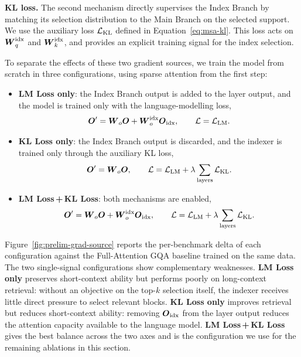 \documentclass{llmxive}
\providecommand{\bm}[1]{\boldsymbol{#1}}
\providecommand{\Ls}{\mathcal{L}}
\providecommand{\Figref}[1]{Figure~\ref{#1}}
\providecommand{\Eqref}[1]{Equation~\ref{#1}}
\providecommand{\mO}{{\bm{O}}}
\providecommand{\mW}{{\bm{W}}}
\begin{document}
\textbf{KL loss.} The second mechanism directly supervises the Index Branch by matching its selection distribution to the Main Branch on the selected support. We use the auxiliary loss $\Ls_{\rm KL}$ defined in \Eqref{eq:msa-kl}. This loss acts on $\mW^{\rm idx}_q$ and $\mW^{\rm idx}_k$, and provides an explicit training signal for the index selection. 

To separate the effects of these two gradient sources, we train the model from scratch in three configurations, using sparse attention from the first step:
\begin{itemize}
    \item \textbf{LM Loss only}: the Index Branch output is added to the layer output, and the model is trained only with the language-modelling loss,
    \begin{equation}
    \mO' = \mW_o \mO + \mW^{\rm idx}_o \mO_{\rm idx},
    \qquad
    \Ls = \Ls_{\rm LM}.
    \end{equation}

    \item \textbf{KL Loss only}: the Index Branch output is discarded, and the indexer is trained only through the auxiliary KL loss,
    \begin{equation}
    \mO' = \mW_o \mO,
    \qquad
    \Ls =\Ls_{\rm LM}+\lambda \sum_{\rm layers} \Ls_{\rm KL}.
    \end{equation}

    \item \textbf{LM Loss\,+\,KL Loss}: both mechanisms are enabled,
    \begin{equation}
    \mO' = \mW_o \mO + \mW^{\rm idx}_o \mO_{\rm idx},
    \qquad
    \Ls =\Ls_{\rm LM}+\lambda \sum_{\rm layers} \Ls_{\rm KL}.
    \end{equation}
\end{itemize}

\Figref{fig:prelim-grad-source} reports the per-benchmark delta of each configuration against the Full-Attention GQA baseline trained on the same data. The two single-signal configurations show complementary weaknesses. \textbf{LM Loss only} preserves short-context ability but performs poorly on long-context retrieval: without an objective on the top-$k$ selection itself, the indexer receives little direct pressure to select relevant blocks. \textbf{KL Loss only} improves retrieval but reduces short-context ability: removing $\mO_{\rm idx}$ from the layer output reduces the attention capacity available to the language model. \textbf{LM Loss\,+\,KL Loss} gives the best balance across the two axes and is the configuration we use for the remaining ablations in this section.
\end{document}
